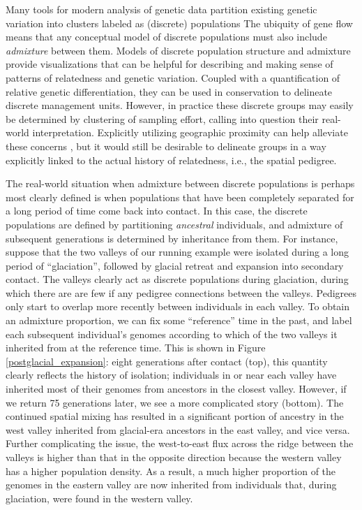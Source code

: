 \documentclass{ar-1col}
\renewcommand{\emph}[1]{{\textit{#1}}}
\begin{document}
Many tools for modern analysis of genetic data
partition existing genetic variation into clusters labeled as (discrete) populations
\citep[e.g.,][]{STRUCTURE, ADMIXTURE}
The ubiquity of gene flow means that
any conceptual model of discrete populations 
must also include \emph{admixture} between them.
Models of discrete population structure and admixture 
provide visualizations that can be helpful for
describing and making sense of patterns of relatedness and genetic variation.
Coupled with a quantification of relative genetic differentiation,
they can be used in conservation to delineate discrete management units.
However, in practice these discrete groups may easily be determined
by clustering of sampling effort,
calling into question their real-world interpretation.
Explicitly utilizing geographic proximity can help alleviate these concerns \citep{conStruct},
but it would still be desirable to delineate groups in a way explicitly linked
to the actual history of relatedness, i.e., the spatial pedigree.

The real-world situation when admixture between discrete populations 
is perhaps most clearly defined is when populations that have been completely separated
for a long period of time come back into contact.
In this case, the discrete populations are defined by partitioning \emph{ancestral} individuals,
and admixture of subsequent generations is determined by inheritance from them.
For instance, suppose that 
the two valleys of our running example
were isolated during a long period of ``glaciation'',
followed by glacial retreat and expansion into secondary contact.
The valleys clearly act as discrete populations during glaciation, 
during which there are are few if any pedigree connections between the valleys.
Pedigrees only start to overlap more recently between individuals in each valley.
To obtain an admixture proportion,
we can fix some ``reference'' time in the past,
and label each subsequent individual's genomes
according to which of the two valleys it inherited from at the reference time.
This is shown in Figure \ref{postglacial_expansion}:
eight generations after contact (top),
this quantity clearly reflects the history of isolation;  
individuals in or near each valley have inherited most of their genomes 
from ancestors in the closest valley.
However, if we return 75 generations later, 
we see a more complicated story (bottom).
The continued spatial mixing has resulted in a significant 
portion of ancestry in the west valley inherited from 
glacial-era ancestors in the east valley, 
and vice versa.
Further complicating the issue, 
the west-to-east flux across the ridge between the valleys 
is higher than that in the opposite direction 
because the western valley has a higher population density. 
As a result, a much higher proportion of the genomes
in the eastern valley are now inherited 
from individuals that, 
during glaciation, were found in the western valley.
\end{document}
